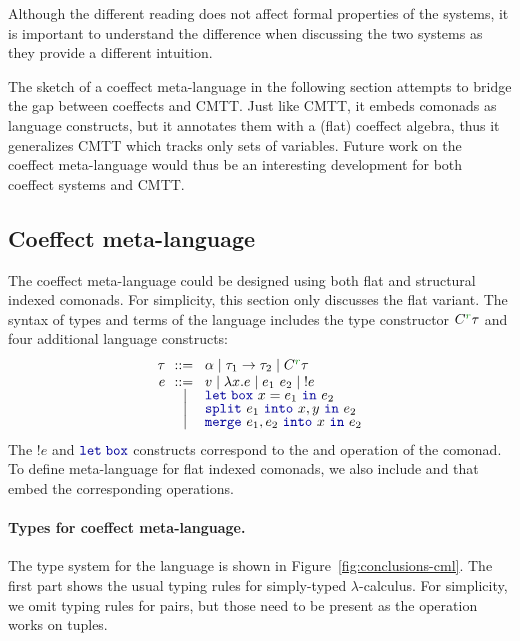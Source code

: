 \noindent
Although the different reading does not affect formal properties of the systems, it is important
to understand the difference when discussing the two systems as they provide a different 
intuition.

The sketch of a coeffect meta-language in the following section attempts to bridge the gap
between coeffects and CMTT. Just like CMTT, it embeds comonads as language constructs, but
it annotates them with a (flat) coeffect algebra, thus it generalizes CMTT which tracks only
sets of variables. Future work on the coeffect meta-language would thus be an interesting 
development for both coeffect systems and CMTT.


\subsection{Coeffect meta-language}

The coeffect meta-language could be designed using both flat and structural indexed comonads.
For simplicity, this section only discusses the flat variant. The syntax of types and terms
of the language includes the type constructor $\ctyp{\cclrd{r}}{\tau}$ and four additional
language constructs:
%
\begin{equation*}
\begin{array}{rcl}
 \tau &\narrow{::=}& \alpha \sep \tau_1 \rightarrow \tau_2 \sep \ctyp{\cclrd{r}}{\tau}\\
 e &\narrow{::=}& v \sep \lambda x.e \sep e_1~e_2 \sep !e    \\[-0.25em]
  &        \sep& \kvd{let\;box}~x=e_1~\kvd{in}~e_2           \\[-0.25em]
  &        \sep& \kvd{split}~e_1~\kvd{into}~x,y~\kvd{in}~e_2 \\[-0.25em]
  &        \sep& \kvd{merge}~e_1, e_2~\kvd{into}~x~\kvd{in}~e_2 
\end{array}
\end{equation*}
%
The $!e$ and $\kvd{let\;box}$ constructs correspond to the  and 
operation of the comonad. To define meta-language for flat indexed comonads, we also include 
 and  that embed the corresponding operations. 

\paragraph{Types for coeffect meta-language.}
The type system for the language is shown in Figure~\ref{fig:conclusions-cml}. The first part
shows the usual typing rules for simply-typed $\lambda$-calculus. For simplicity, we omit typing 
rules for pairs, but those need to be present as the  operation works on tuples.

